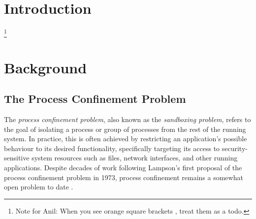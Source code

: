 \documentclass[dvipsnames, 12pt]{article}
\begin{document}
\clearpage

\setcounter{page}{1}


\setcounter{page}{1}

\onehalfspacing

\section{Introduction}

\footnote{Note for Anil: When you see orange square brackets , treat them as a todo.}

\section{Background}

\subsection{The Process Confinement Problem}

The \textit{process confinement problem}, also known as the \textit{sandboxing
problem}, refers to the goal of isolating a process or group of processes from
the rest of the running system. In practice, this is often achieved by
restricting an application's possible behaviour to its desired functionality,
specifically targeting its access to security-sensitive system resources such as
files, network interfaces, and other running applications.
Despite decades of work following Lampson's \cite{lampson1973_a_note} first
proposal of the process confinement problem in 1973, process confinement remains
a somewhat open problem to date \cite{crowell2013_confinement_problem}.

\end{document}
